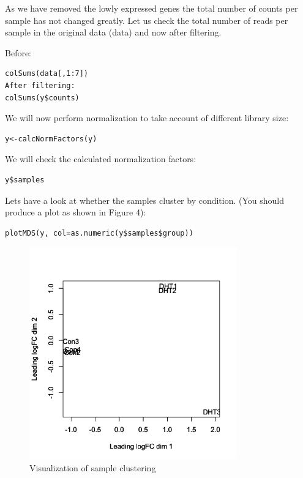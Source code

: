 As we have removed the lowly expressed genes the total number of counts per sample has not changed greatly. Let us check the total number of reads per sample in the original data (data) and now after filtering.

\begin{steps}
Before:	


\begin{lstlisting}
colSums(data[,1:7])
After filtering:
colSums(y$counts)
\end{lstlisting}\end{steps}


\begin{steps}
We will now perform normalization to take account of different library size:
\begin{lstlisting}
y<-calcNormFactors(y)
\end{lstlisting}

We will check the calculated normalization factors:
\begin{lstlisting}
y$samples
\end{lstlisting}

Lets have a look at whether the samples cluster by condition. (You should produce a plot
as shown in Figure 4):
\begin{lstlisting}
plotMDS(y, col=as.numeric(y$samples$group))
\end{lstlisting}
\end{steps}

\begin{figure}[H]
\centering
\includegraphics[width=0.8\textwidth]{handout/MDS.png}
\caption{Visualization of sample clustering}
\label{fig:MDS plot}
\end{figure}

